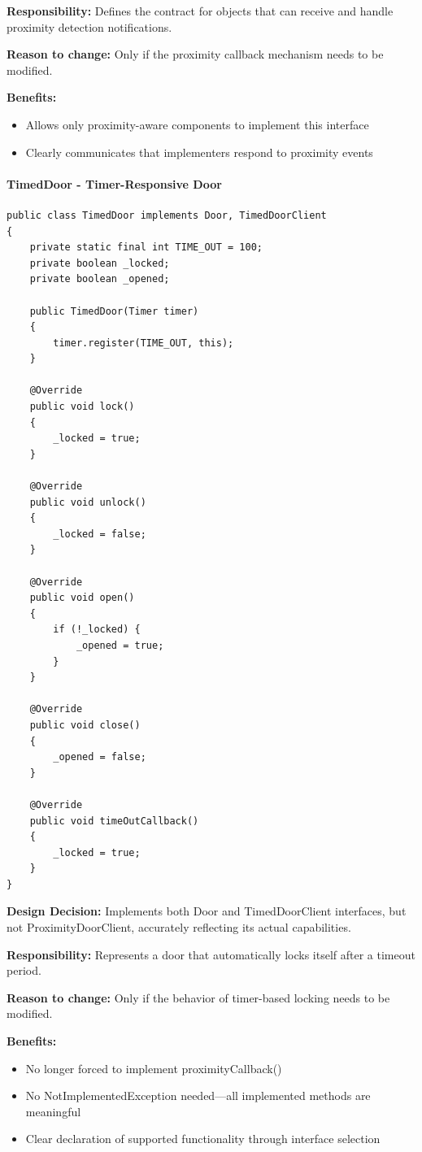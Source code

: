\textbf{Responsibility:} Defines the contract for objects that can receive and handle proximity detection notifications.

\textbf{Reason to change:} Only if the proximity callback mechanism needs to be modified.

\textbf{Benefits:}
\begin{itemize}
    \item Allows only proximity-aware components to implement this interface
    \item Clearly communicates that implementers respond to proximity events
\end{itemize}

\paragraph{TimedDoor - Timer-Responsive Door}

\begin{verbatim}
public class TimedDoor implements Door, TimedDoorClient
{
    private static final int TIME_OUT = 100;
    private boolean _locked;
    private boolean _opened;

    public TimedDoor(Timer timer)
    {
        timer.register(TIME_OUT, this);
    }

    @Override
    public void lock()
    {
        _locked = true;
    }

    @Override
    public void unlock()
    {
        _locked = false;
    }

    @Override
    public void open()
    {
        if (!_locked) {
            _opened = true;
        }
    }

    @Override
    public void close()
    {
        _opened = false;
    }

    @Override
    public void timeOutCallback()
    {
        _locked = true;
    }
}
\end{verbatim}

\textbf{Design Decision:} Implements both Door and TimedDoorClient interfaces, but not ProximityDoorClient, accurately reflecting its actual capabilities.

\textbf{Responsibility:} Represents a door that automatically locks itself after a timeout period.

\textbf{Reason to change:} Only if the behavior of timer-based locking needs to be modified.

\textbf{Benefits:}
\begin{itemize}
    \item No longer forced to implement proximityCallback()
    \item No NotImplementedException needed—all implemented methods are meaningful
    \item Clear declaration of supported functionality through interface selection
\end{itemize}

